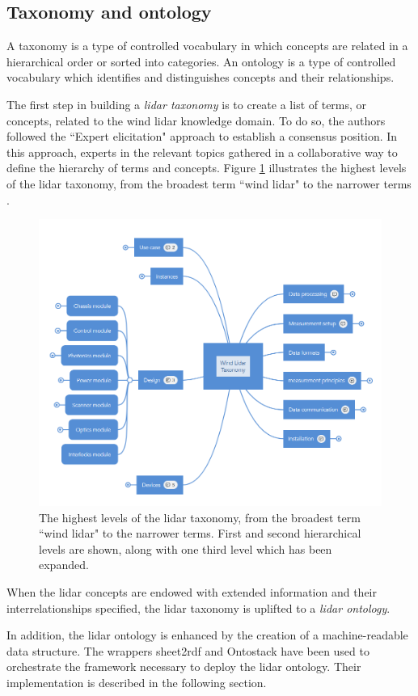 \documentclass[remotesensing,article,submit,pdftex,moreauthors]{Definitions/mdpi}
\begin{document}
\subsection{Taxonomy and ontology}
A taxonomy is a type of controlled vocabulary in which concepts are related in a hierarchical order or sorted into categories.
An ontology is a type of controlled vocabulary
which identifies and distinguishes concepts and their relationships.

The first step in building a {\it lidar taxonomy} is to create a list of terms, or concepts, related to the wind lidar knowledge domain. To do so, the authors followed the ``Expert elicitation" approach to establish a consensus position. In this approach, experts in the relevant topics gathered in a collaborative way to define the hierarchy of terms and concepts. Figure \ref{fig:tax} illustrates the highest levels of the lidar taxonomy, from the broadest term ``wind lidar" to the narrower terms \cite{ref-IRPWind}.
\begin{figure}[h]
    \centering
    \includegraphics[width=12cm]{Figures/MindMap.PNG}
    \caption{The highest levels of the lidar taxonomy, from the broadest term ``wind lidar" to the narrower terms. First and second hierarchical levels are shown, along with one third level which has been expanded.}
    \label{fig:tax}
\end{figure}
When the lidar concepts are endowed with extended information and their interrelationships specified, the lidar taxonomy is uplifted to a {\it lidar ontology}.

In addition, the lidar ontology is enhanced by the creation of a machine-readable data structure.
The wrappers sheet2rdf \cite{ref-Fiorelli2015} and Ontostack \cite{ref-OntoStack} have been used to orchestrate the framework necessary to deploy the lidar ontology. Their implementation is described in the following section.
\end{document}
